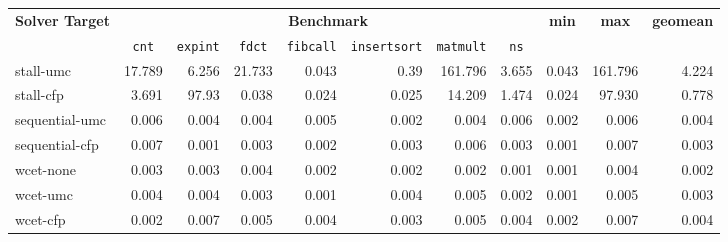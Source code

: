 
\begin{tabular}{|l||r|r|r|r|r|r|r||r|r|r|}
\hline

\multirow{2}{*}{\bf Solver Target}&\multicolumn{7}{c||}{\bf Benchmark}      &\multicolumn{1}{c|}{\multirow{2}{*}{\bf min}}&\multicolumn{1}{c|}{\multirow{2}{*}{\bf max}}&\multicolumn{1}{c|}{\multirow{2}{*}{\bf geomean}} \\ \cline{2-8}
&\multicolumn{1}{c|}{\tt cnt}&\multicolumn{1}{c|}{\tt expint}&\multicolumn{1}{c|}{\tt fdct}&\multicolumn{1}{c|}{\tt fibcall}&\multicolumn{1}{c|}{\tt insertsort}&\multicolumn{1}{c|}{\tt matmult}&\multicolumn{1}{c||}{\tt ns}&&& \\ \hline \hline
stall-umc&17.789&6.256&21.733&0.043&0.39&161.796&3.655&0.043&161.796&4.224 \\ \hline
stall-cfp&3.691&97.93&0.038&0.024&0.025&14.209&1.474&0.024&97.930&0.778 \\ \hline \hline
sequential-umc&0.006&0.004&0.004&0.005&0.002&0.004&0.006&0.002&0.006&0.004 \\ \hline
sequential-cfp&0.007&0.001&0.003&0.002&0.003&0.006&0.003&0.001&0.007&0.003 \\ \hline \hline
wcet-none&0.003&0.003&0.004&0.002&0.002&0.002&0.001&0.001&0.004&0.002 \\ \hline
wcet-umc&0.004&0.004&0.003&0.001&0.004&0.005&0.002&0.001&0.005&0.003 \\ \hline
wcet-cfp&0.002&0.007&0.005&0.004&0.003&0.005&0.004&0.002&0.007&0.004 \\ \hline

\end{tabular}
